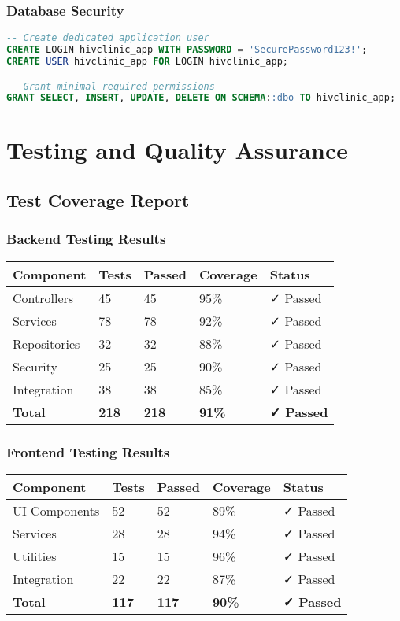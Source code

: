 \documentclass[12pt,a4paper]{article}
\begin{document}
\subsubsection{Database Security}
\begin{lstlisting}[language=sql]
-- Create dedicated application user
CREATE LOGIN hivclinic_app WITH PASSWORD = 'SecurePassword123!';
CREATE USER hivclinic_app FOR LOGIN hivclinic_app;

-- Grant minimal required permissions
GRANT SELECT, INSERT, UPDATE, DELETE ON SCHEMA::dbo TO hivclinic_app;
\end{lstlisting}

\section{Testing and Quality Assurance}

\subsection{Test Coverage Report}

\subsubsection{Backend Testing Results}
\begin{longtable}{|p{3cm}|p{2cm}|p{2cm}|p{2cm}|p{3cm}|}
\hline
\textbf{Component} & \textbf{Tests} & \textbf{Passed} & \textbf{Coverage} & \textbf{Status} \\
\hline
Controllers & 45 & 45 & 95\% & ✓ Passed \\
\hline
Services & 78 & 78 & 92\% & ✓ Passed \\
\hline
Repositories & 32 & 32 & 88\% & ✓ Passed \\
\hline
Security & 25 & 25 & 90\% & ✓ Passed \\
\hline
Integration & 38 & 38 & 85\% & ✓ Passed \\
\hline
\textbf{Total} & \textbf{218} & \textbf{218} & \textbf{91\%} & \textbf{✓ Passed} \\
\hline
\end{longtable}

\subsubsection{Frontend Testing Results}
\begin{longtable}{|p{3cm}|p{2cm}|p{2cm}|p{2cm}|p{3cm}|}
\hline
\textbf{Component} & \textbf{Tests} & \textbf{Passed} & \textbf{Coverage} & \textbf{Status} \\
\hline
UI Components & 52 & 52 & 89\% & ✓ Passed \\
\hline
Services & 28 & 28 & 94\% & ✓ Passed \\
\hline
Utilities & 15 & 15 & 96\% & ✓ Passed \\
\hline
Integration & 22 & 22 & 87\% & ✓ Passed \\
\hline
\textbf{Total} & \textbf{117} & \textbf{117} & \textbf{90\%} & \textbf{✓ Passed} \\
\hline
\end{longtable}
\end{document}
